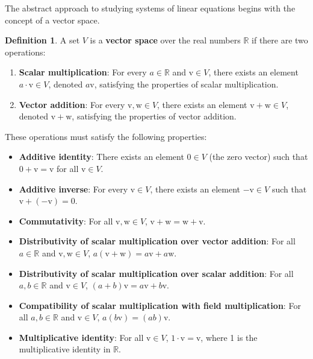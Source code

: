\documentclass[
]{book}
\providecommand{\tightlist}{%
  \setlength{\itemsep}{0pt}\setlength{\parskip}{0pt}}
\theoremstyle{definition}
\newtheorem{definition}{Definition}[chapter]
\theoremstyle{definition}
\theoremstyle{definition}
\theoremstyle{definition}
\theoremstyle{remark}
\begin{document}
The abstract approach to studying systems of linear equations begins with the concept of a vector space.

\begin{definition}

A set \(V\) is a \textbf{vector space} over the real numbers \(\mathbb{R}\) if there are two operations:

\begin{enumerate}
\def\labelenumi{\arabic{enumi}.}
\item
  \textbf{Scalar multiplication}: For every \(a \in \mathbb{R}\) and \(\mathrm{v} \in V\), there exists an element \(a \cdot \mathrm{v} \in V\), denoted \(a\mathrm{v}\), satisfying the properties of scalar multiplication.
\item
  \textbf{Vector addition}: For every \(\mathrm{v}, \mathrm{w} \in V\), there exists an element \(\mathrm{v} + \mathrm{w} \in V\), denoted \(\mathrm{v} + \mathrm{w}\), satisfying the properties of vector addition.
\end{enumerate}

These operations must satisfy the following properties:

\begin{itemize}
\tightlist
\item
  \textbf{Additive identity}: There exists an element \(\mathrm{0} \in V\) (the zero vector) such that \(\mathrm{0} + \mathrm{v} = \mathrm{v}\) for all \(\mathrm{v} \in V\).\\
\item
  \textbf{Additive inverse}: For every \(\mathrm{v} \in V\), there exists an element \(-\mathrm{v} \in V\) such that \(\mathrm{v} + (-\mathrm{v}) = \mathrm{0}\).\\
\item
  \textbf{Commutativity}: For all \(\mathrm{v}, \mathrm{w} \in V\), \(\mathrm{v} + \mathrm{w} = \mathrm{w} + \mathrm{v}\).\\
\item
  \textbf{Distributivity of scalar multiplication over vector addition}: For all \(a \in \mathbb{R}\) and \(\mathrm{v}, \mathrm{w} \in V\), \(a(\mathrm{v} + \mathrm{w}) = a\mathrm{v} + a\mathrm{w}\).\\
\item
  \textbf{Distributivity of scalar multiplication over scalar addition}: For all \(a, b \in \mathbb{R}\) and \(\mathrm{v} \in V\), \((a + b)\mathrm{v} = a\mathrm{v} + b\mathrm{v}\).\\
\item
  \textbf{Compatibility of scalar multiplication with field multiplication}: For all \(a, b \in \mathbb{R}\) and \(\mathrm{v} \in V\), \(a(b\mathrm{v}) = (ab)\mathrm{v}\).\\
\item
  \textbf{Multiplicative identity}: For all \(\mathrm{v} \in V\), \(1 \cdot \mathrm{v} = \mathrm{v}\), where 1 is the multiplicative identity in \(\mathbb{R}\).\\
\end{itemize}

\end{definition}
\end{document}
